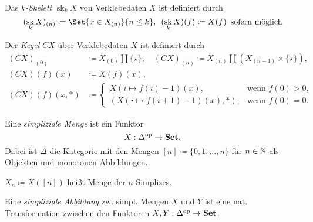 \documentclass{cheat-sheet}
\DeclareMathOperator{\sk}{sk} %
\begin{document}

\begin{defn}
  Das \emph{$k$-Skelett} $\sk_k X$ von Verklebedaten $X$ ist definiert durch
  \[
    (\sk_k X)_{(n)} \coloneqq
    \Set{ x \in X_{(n)} }{ n \leq k }, \enspace
    (\sk_k X)(f) \coloneqq X(f) \enspace \text{sofern möglich}
  \]
\end{defn}

\begin{defn}
  Der \emph{Kegel} $CX$ über Verklebedaten $X$ ist definiert durch
  \begin{align*}
    (CX)_{(0)} & \coloneqq X_{(0)} \amalg \{ \star \}, \quad (CX)_{(n)} \coloneqq X_{(n)} \amalg (X_{(n-1)} \times \{ \star \}), \\
    (CX)(f)(x) & \coloneqq X(f)(x), \\
    (CX)(f)(x,*) &  \coloneqq \begin{cases}
      X(i \mapsto f(i) - 1)(x), & \text{wenn $f(0) > 0$,} \\
      (X(i \mapsto f(i{+}1) - 1)(x), *), & \text{wenn $f(0) = 0$.}
    \end{cases}
  \end{align*}
\end{defn}



\begin{defn}
  Eine \emph{simpliziale Menge} ist ein Funktor
  \[ X : \Delta^{\mathrm{op}} \to \mathbf{Set}. \]
  Dabei ist $\Delta$ die Kategorie mit den Mengen
  $[n] \coloneqq \{ 0, 1, \ldots, n \}$ für $n \in \mathbb{N}$ als Objekten und monotonen Abbildungen.
\end{defn}

\begin{nota}
  $X_n \coloneqq X([n])$ heißt Menge der $n$-Simplizes.
\end{nota}

\begin{defn}
  Eine \emph{simpliziale Abbildung} zw. simpl. Mengen $X$ und $Y$ ist eine nat. Transformation zwischen den Funktoren $X, Y : \Delta^{\mathrm{op}} \to \mathbf{Set}$.
\end{defn}
\end{document}
